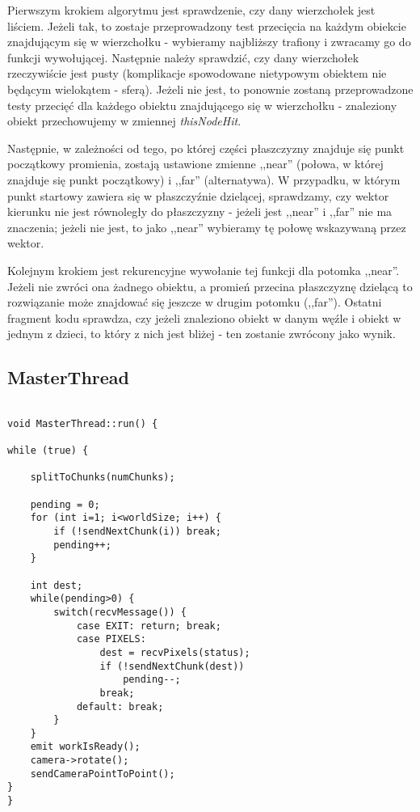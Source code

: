Pierwszym krokiem algorytmu jest sprawdzenie, czy dany wierzchołek jest liściem. Jeżeli tak, to zostaje przeprowadzony test przecięcia na każdym obiekcie znajdującym się w wierzchołku - wybieramy najbliższy trafiony i zwracamy go do funkcji wywołującej. Następnie należy sprawdzić, czy dany wierzchołek rzeczywiście jest pusty (komplikacje spowodowane nietypowym obiektem nie będącym wielokątem - sferą). Jeżeli nie jest, to ponownie zostaną przeprowadzone testy przecięć dla każdego obiektu znajdującego się w wierzchołku - znaleziony obiekt przechowujemy w zmiennej \emph{thisNodeHit}.

Następnie, w zależności od tego, po której części płaszczyzny znajduje się punkt początkowy promienia, zostają ustawione zmienne ,,near'' (połowa, w której znajduje się punkt początkowy) i ,,far'' (alternatywa). W przypadku, w którym punkt startowy zawiera się w płaszczyźnie dzielącej, sprawdzamy, czy wektor kierunku nie jest równoległy do płaszczyzny - jeżeli jest ,,near'' i ,,far'' nie ma znaczenia; jeżeli nie jest, to jako ,,near'' wybieramy tę połowę wskazywaną przez wektor.

Kolejnym krokiem jest rekurencyjne wywołanie tej funkcji dla potomka ,,near''. Jeżeli nie zwróci ona żadnego obiektu, a promień przecina płaszczyznę dzielącą to rozwiązanie może znajdować się jeszcze w drugim potomku (,,far''). Ostatni fragment kodu sprawdza, czy jeżeli znaleziono obiekt w danym węźle i obiekt w jednym z dzieci, to który z nich jest bliżej - ten zostanie zwrócony jako wynik.

\subsection{MasterThread}
	
	
\begin{lstlisting}[caption={Fragment klasy \emph{MasterThread}}]

void MasterThread::run() {

while (true) {

    splitToChunks(numChunks);

    pending = 0;
    for (int i=1; i<worldSize; i++) {
        if (!sendNextChunk(i)) break;
        pending++;
    }

    int dest;
    while(pending>0) {
        switch(recvMessage()) {
            case EXIT: return; break;
            case PIXELS:
                dest = recvPixels(status);
                if (!sendNextChunk(dest))
                    pending--;
                break;
            default: break;
        }
    }
 	emit workIsReady();
    camera->rotate();
    sendCameraPointToPoint();
}
}

\end{lstlisting}


